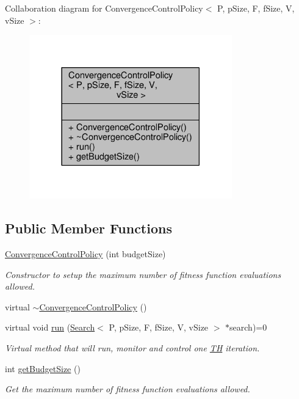 Collaboration diagram for Convergence\+Control\+Policy$<$ P, p\+Size, F, f\+Size, V, v\+Size $>$\+:
\nopagebreak
\begin{figure}[H]
\begin{center}
\leavevmode
\includegraphics[width=249pt]{classConvergenceControlPolicy__coll__graph}
\end{center}
\end{figure}
\subsection*{Public Member Functions}
\begin{DoxyCompactItemize}
\item 
\hyperlink{classConvergenceControlPolicy_a8882660f0bfd404494339aed74d625a2}{Convergence\+Control\+Policy} (int budget\+Size)
\begin{DoxyCompactList}\small\item\em Constructor to setup the maximum number of fitness function evaluations allowed. \end{DoxyCompactList}\item 
virtual \hyperlink{classConvergenceControlPolicy_a1827a6722494ff97719a2383976e9c11}{$\sim$\+Convergence\+Control\+Policy} ()
\item 
virtual void \hyperlink{classConvergenceControlPolicy_ad72beb5807e87c3fa0602bd0bf4679ac}{run} (\hyperlink{classSearch}{Search}$<$ P, p\+Size, F, f\+Size, V, v\+Size $>$ $\ast$search)=0
\begin{DoxyCompactList}\small\item\em Virtual method that will run, monitor and control one \hyperlink{classTH}{TH} iteration. \end{DoxyCompactList}\item 
int \hyperlink{classConvergenceControlPolicy_a445c537935922b1bcb67d3732abbfe0f}{get\+Budget\+Size} ()
\begin{DoxyCompactList}\small\item\em Get the maximum number of fitness function evaluations allowed. \end{DoxyCompactList}\end{DoxyCompactItemize}


